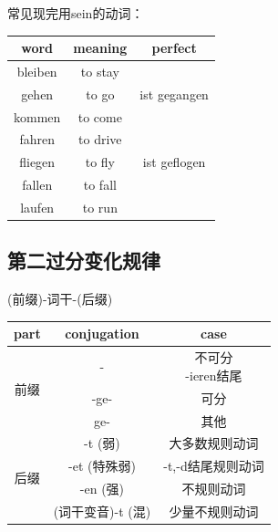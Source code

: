 常见现完用sein的动词：
\begin{center}
    \begin{tabular}{|c|c|c|}
        \hline
        \rowcolor{gray}
        word    & meaning  & perfect      \\
        \hline
        bleiben & to stay  &              \\
        \hline
        gehen   & to go    & ist gegangen \\
        \hline
        kommen  & to come  &              \\
        \hline
        fahren  & to drive &              \\
        \hline
        fliegen & to fly   & ist geflogen \\
        \hline
        fallen  & to fall  &              \\
        \hline
        laufen  & to run   &              \\
        \hline
    \end{tabular}
\end{center}

\subsection{第二过分变化规律}
(前缀)-词干-(后缀)

\begin{center}
    \begin{tabular}{|c|c|c|}
        \hline
        \rowcolor{gray}
        part                & conjugation  & case          \\
        \hline
        \multirow{3}{*}{前缀} & -            & \makecell{不可分 \\ -ieren结尾}  \\
        \cline{2-3}
                            & -ge-         & 可分            \\
        \cline{2-3}
                            & ge-          & 其他            \\
        \hline
        \multirow{4}{*}{后缀} & -t (弱)       & 大多数规则动词       \\
        \cline{2-3}
                            & -et (特殊弱)    & -t,-d结尾规则动词   \\
        \cline{2-3}
                            & -en (强)      & 不规则动词         \\
        \cline{2-3}
                            & (词干变音)-t (混) & 少量不规则动词       \\
        \hline
    \end{tabular}
\end{center}

